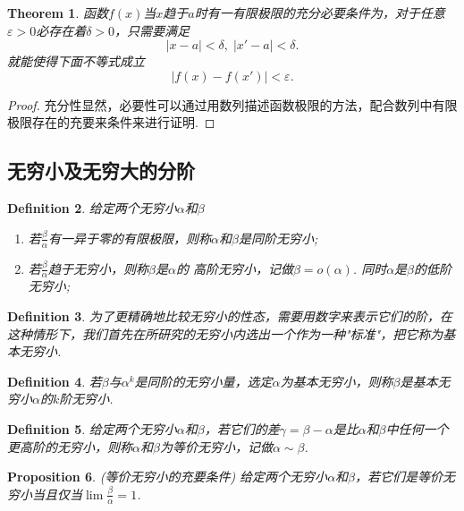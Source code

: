 \documentclass{article}
\newtheorem{theorem}{Theorem}[section]
\newtheorem{proposition}[theorem]{Proposition}
\newtheorem{definition}[theorem]{Definition}
\begin{document}
\begin{theorem}
\rm 函数$f(x)$当$x$趋于$a$时有一有限极限的充分必要条件为，对于任意$\varepsilon > 0$必存在着$\delta > 0$，只需要满足
$$
|x-a| < \delta,\; |x'-a| < \delta.
$$
就能使得下面不等式成立
$$
|f(x)-f(x')| < \varepsilon.
$$
\end{theorem}

\begin{proof}
{\color{blue}充分性显然，必要性可以通过用数列描述函数极限的方法，配合数列中有限极限存在的充要来条件来进行证明}.
\end{proof}

\subsection{无穷小及无穷大的分阶}


\begin{definition}
\rm 给定两个无穷小$\alpha$和$\beta$
\begin{enumerate}
	\item 若$\frac{\beta}{\alpha}$有一异于零的有限极限，则称$\alpha$和$\beta$是{\color{red}同阶无穷小};
	\item 若$\frac{\beta}{\alpha}$趋于无穷小，则称$\beta$是$\alpha$的{\color{red} 高阶无穷小}，记做$\beta = o(\alpha)$.
	同时$\alpha$是$\beta$的低阶无穷小;
\end{enumerate}
\end{definition}

\begin{definition}
\rm 为了更精确地比较无穷小的性态，需要用数字来表示它们的阶，在这种情形下，我们首先在所研究的无穷小内选出一个作为一种"标准"，把它称为{\color{red}基本无穷小}.
\end{definition}

\begin{definition}
\rm 若$\beta$与$\alpha^k$是同阶的无穷小量，选定$\alpha$为基本无穷小，则称$\beta$是基本无穷小$\alpha$的$k$阶无穷小.
\end{definition}

\begin{definition}
\rm 给定两个无穷小$\alpha$和$\beta$，若它们的差$\gamma = \beta - \alpha$是比$\alpha$和$\beta$中任何一个更高阶的无穷小，则称$\alpha$和$\beta$为{\color{red}等价无穷小}，记做$\alpha \sim \beta$.
\end{definition}

\begin{proposition}
\rm {\color{red} (等价无穷小的充要条件)} 给定两个无穷小$\alpha$和$\beta$，若它们是等价无穷小当且仅当$\lim \frac{\beta}{\alpha} = 1$.
\end{proposition}
\end{document}
